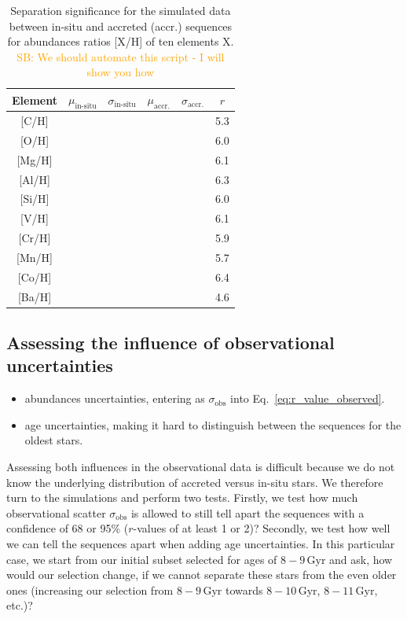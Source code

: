 \documentclass[fleqn,usenatbib]{mnras}
\newcommand{\SB}[1]{{\textcolor{orange}{SB: #1}}}
\begin{document}
\begin{table}
    \centering
    \caption{Separation significance for the simulated data between in-situ and accreted (accr.) sequences for abundances ratios [X/H] of ten elements X. \SB{We should automate this script - I will show you how}}
    \begin{tabular}{cccccc}
    \hline
    Element & $\mu_\text{in-situ}$ & $\sigma_\text{in-situ}$ & $\mu_\text{accr.}$ & $\sigma_\text{accr.}$ & $r$\\
    \hline \hline
    {[C/H]}  & & & & & 5.3 \\
    {[O/H]}  & & & & & 6.0 \\
    {[Mg/H]} & & & & & 6.1 \\
    {[Al/H]} & & & & & 6.3 \\
    {[Si/H]} & & & & & 6.0 \\
    {[V/H]}  & & & & & 6.1 \\
    {[Cr/H]} & & & & & 5.9 \\
    {[Mn/H]} & & & & & 5.7 \\
    {[Co/H]} & & & & & 6.4 \\
    {[Ba/H]} & & & & & 4.6 \\
    \hline
    \end{tabular}
    \label{tab:r_values_simulation}
\end{table}

\subsection{Assessing the influence of observational uncertainties}

\begin{itemize}
    \item abundances uncertainties, entering as $\sigma_{\text{obs}}$ into Eq.~\ref{eq:r_value_observed}.
    \item age uncertainties, making it hard to distinguish between the sequences for the oldest stars.
\end{itemize}

Assessing both influences in the observational data is difficult because we do not know the underlying distribution of accreted versus in-situ stars. We therefore turn to the simulations and perform two tests. Firstly, we test how much observational scatter $\sigma_{\text{obs}}$ is allowed to still tell apart the sequences with a confidence of 68 or 95\% ($r$-values of at least 1 or 2)? Secondly, we test how well we can tell the sequences apart when adding age uncertainties. In this particular case, we start from our initial subset selected for ages of $8-9\,\mathrm{Gyr}$ and ask, how would our selection change, if we cannot separate these stars from the even older ones (increasing our selection from $8-9\,\mathrm{Gyr}$ towards $8-10\,\mathrm{Gyr}$, $8-11\,\mathrm{Gyr}$, etc.)?
\end{document}
